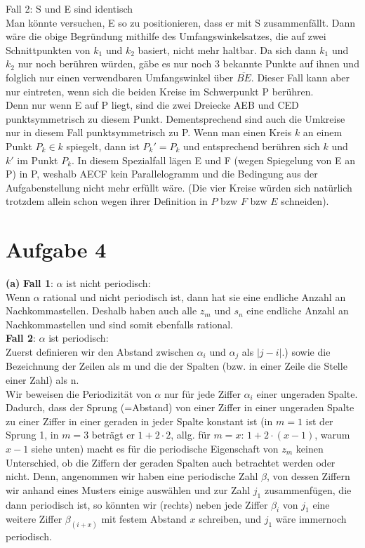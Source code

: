 \documentclass[11pt,a4paper,oneside,]{article}
\begin{document}
\newepage
Fall 2: S und E sind identisch\\
Man könnte versuchen, E so zu positionieren, dass er mit S zusammenfällt. Dann wäre die obige Begründung  mithilfe des Umfangswinkelsatzes, die auf zwei Schnittpunkten von $k_1$ und $k_2$ basiert, nicht mehr haltbar. Da sich dann $k_1$ und $k_2$ nur noch berühren würden, gäbe es nur noch 3 bekannte Punkte auf ihnen und folglich nur einen verwendbaren Umfangswinkel über $\overline{BE}$. Dieser Fall kann aber nur eintreten, wenn sich die beiden Kreise im Schwerpunkt P berühren.\\
Denn nur wenn E auf P liegt, sind die zwei Dreiecke AEB und CED punktsymmetrisch zu diesem Punkt. Dementsprechend sind auch die Umkreise nur in diesem Fall punktsymmetrisch zu P.  Wenn man einen Kreis $k$ an einem Punkt $P_k \in k$ spiegelt, dann ist $P_k' = P_k$ und entsprechend berühren sich $k$ und $k'$ im Punkt $P_k$.
In diesem Spezialfall lägen E und F (wegen Spiegelung von E an P) in P, weshalb AECF kein Parallelogramm und die Bedingung aus der Aufgabenstellung nicht mehr erfüllt wäre. (Die vier Kreise würden sich natürlich trotzdem allein schon wegen ihrer Definition in $P$ bzw $F$ bzw $E$ schneiden).
\newpage
\section{Aufgabe 4}
{\bf (a)}
{\bf Fall 1}: $\alpha$ ist nicht periodisch:\\
Wenn $\alpha$ rational und nicht periodisch ist, dann hat sie eine endliche Anzahl an Nachkommastellen. Deshalb haben auch alle $z_m$ und $s_n$ eine endliche Anzahl an Nachkommastellen und sind somit ebenfalls rational.\\

{\bf Fall 2}: $\alpha$ ist periodisch:\\
Zuerst definieren wir den Abstand zwischen $\alpha_i$ und $\alpha_j$ als $|j-i|$.) sowie die Bezeichnung der Zeilen als m und die der Spalten (bzw. in einer Zeile die Stelle einer Zahl) als n.\\

Wir beweisen die Periodizität von $\alpha$ nur für jede Ziffer $\alpha_i$ einer ungeraden Spalte. Dadurch, dass der Sprung (=Abstand) von einer Ziffer in einer ungeraden Spalte zu einer Ziffer in einer geraden in jeder Spalte konstant ist (in $m=1$ ist der Sprung 1, in $m=3 $ beträgt er $ 1+2\cdot2$, allg. für $m=x$: $1+2\cdot (x-1)$, warum $x-1$ siehe unten)  macht es für die periodische Eigenschaft von $z_m$ keinen Unterschied, ob die Ziffern der geraden Spalten auch betrachtet werden oder nicht. Denn, angenommen wir haben eine periodische Zahl $\beta$, von dessen Ziffern wir anhand eines Musters einige auswählen und zur Zahl $j_1$ zusammenfügen, die dann periodisch ist, so könnten wir (rechts) neben jede Ziffer $\beta_i$ von $j_1$ eine weitere Ziffer $\beta_(i+x)$ mit festem Abstand $x$ schreiben, und $j_1$ wäre immernoch periodisch. 
\end{document}
